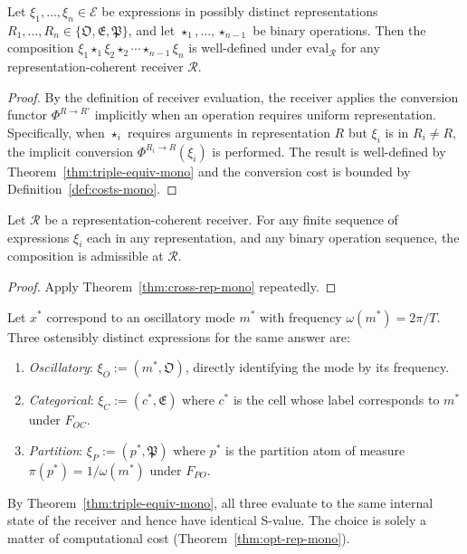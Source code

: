 \begin{theorem}\label{thm:cross-rep-mono}
Let $\xi_1, \ldots, \xi_n \in \mathcal{E}$ be expressions in possibly distinct
representations $R_1, \ldots, R_n \in \{\mathfrak{O}, \mathfrak{E}, \mathfrak{P}\}$,
and let $\star_1, \ldots, \star_{n-1}$ be binary operations.  Then the
composition $\xi_1 \star_1 \xi_2 \star_2 \cdots \star_{n-1} \xi_n$ is
well-defined under $\mathrm{eval}_{\mathcal{R}}$ for any
representation-coherent receiver $\mathcal{R}$.
\end{theorem}

\begin{proof}
By the definition of receiver evaluation, the receiver applies the conversion
functor $\Phi^{R \to R'}$ implicitly when an operation requires uniform
representation.  Specifically, when $\star_i$ requires arguments in
representation $R$ but $\xi_i$ is in $R_i \neq R$, the implicit conversion
$\Phi^{R_i \to R}(\xi_i)$ is performed.  The result is well-defined by
Theorem~\ref{thm:triple-equiv-mono} and the conversion cost is bounded by
Definition~\ref{def:costs-mono}.
\end{proof}

\begin{corollary}\label{cor:apples-mono}
Let $\mathcal{R}$ be a representation-coherent receiver.  For any finite
sequence of expressions $\xi_i$ each in any representation, and any binary
operation sequence, the composition is admissible at $\mathcal{R}$.
\end{corollary}

\begin{proof}
Apply Theorem~\ref{thm:cross-rep-mono} repeatedly.
\end{proof}

\begin{example}
Let $x^{*}$ correspond to an oscillatory mode $m^{*}$ with frequency
$\omega(m^{*}) = 2\pi/T$.  Three ostensibly distinct expressions for the
same answer are:
\begin{enumerate}[(1)]
  \item \emph{Oscillatory}: $\xi_O := (m^{*}, \mathfrak{O})$, directly
    identifying the mode by its frequency.
  \item \emph{Categorical}: $\xi_C := (c^{*}, \mathfrak{E})$ where $c^{*}$
    is the cell whose label corresponds to $m^{*}$ under $F_{OC}$.
  \item \emph{Partition}: $\xi_P := (p^{*}, \mathfrak{P})$ where $p^{*}$
    is the partition atom of measure $\pi(p^{*}) = 1/\omega(m^{*})$
    under $F_{PO}$.
\end{enumerate}
By Theorem~\ref{thm:triple-equiv-mono}, all three evaluate to the same
internal state of the receiver and hence have identical S-value.  The choice
is solely a matter of computational cost (Theorem~\ref{thm:opt-rep-mono}).
\end{example}

